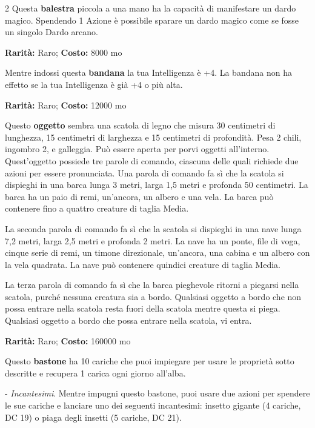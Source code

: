 \begin{multicols}{2}
Questa \textbf{balestra} piccola a una mano ha la capacità di manifestare un dardo magico.
Spendendo 1 Azione è possibile sparare un dardo magico come se fosse un singolo Dardo arcano.


\textbf{Rarità:} Raro; \textbf{Costo:} 8000 mo

Mentre indossi questa \textbf{bandana} la tua Intelligenza è +4. La bandana non ha effetto se la tua Intelligenza è già +4 o più alta.


\textbf{Rarità:} Raro; \textbf{Costo:} 12000 mo

Questo \textbf{oggetto} sembra una scatola di legno che misura 30 centimetri di lunghezza, 15 centimetri di larghezza e 15 centimetri di profondità. Pesa 2 chili, ingombro 2, e galleggia. Può essere aperta per porvi oggetti all'interno. Quest'oggetto possiede tre parole di comando, ciascuna delle quali richiede due azioni per essere pronunciata. Una parola di comando fa sì che la scatola si dispieghi in una barca lunga 3 metri, larga 1,5 metri e profonda 50 centimetri. La barca ha un paio di remi, un'ancora, un albero e una vela. La barca può contenere fino a quattro creature di taglia Media.

La seconda parola di comando fa sì che la scatola si dispieghi in una nave lunga 7,2 metri, larga 2,5 metri e profonda 2 metri. La nave ha un ponte, file di voga, cinque serie di remi, un timone direzionale, un'ancora, una cabina e un albero con la vela quadrata. La nave può contenere quindici creature di taglia Media.

La terza parola di comando fa sì che la barca pieghevole ritorni a piegarsi nella scatola, purché nessuna creatura sia a bordo. Qualsiasi oggetto a bordo che non possa entrare nella scatola resta fuori della scatola mentre questa si piega. Qualsiasi oggetto a bordo che possa entrare nella scatola, vi entra.


\textbf{Rarità:} Raro; \textbf{Costo:} 160000 mo

Questo \textbf{bastone} ha 10 cariche che puoi impiegare per usare le proprietà sotto descritte e recupera 1 carica ogni giorno all'alba.

- \emph{Incantesimi}. Mentre impugni questo bastone, puoi usare due azioni per spendere le sue cariche e lanciare uno dei seguenti incantesimi: insetto gigante (4 cariche, DC 19) o piaga degli insetti (5 cariche, DC 21).


\end{multicols}
